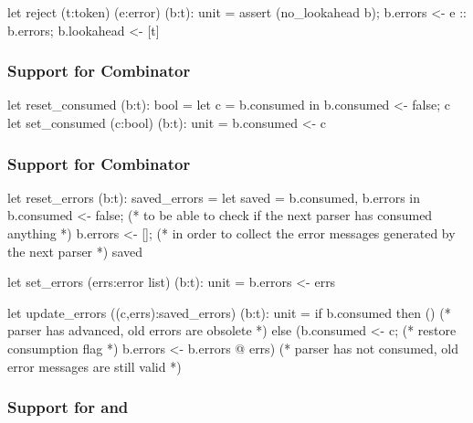 \begin{ocaml}
  let reject (t:token) (e:error) (b:t): unit =
    assert (no_lookahead b);
    b.errors <- e :: b.errors;
    b.lookahead <- [t]
\end{ocaml}


\subsubsection{Support for Combinator \code{<|>}}

\begin{ocaml}
  let reset_consumed (b:t): bool =
     let c = b.consumed in
     b.consumed <- false; c
  let set_consumed (c:bool) (b:t): unit =
     b.consumed <- c
\end{ocaml}

\subsubsection{Support for Combinator }

\begin{ocaml}
  let reset_errors (b:t): saved_errors =
     let saved = b.consumed, b.errors in
     b.consumed <- false;  (* to be able to check if the next parser has
                              consumed anything *)
     b.errors <- [];       (* in order to collect the error messages generated
                              by the next parser *)
     saved

  let set_errors (errs:error list) (b:t): unit =
     b.errors <- errs

  let update_errors ((c,errs):saved_errors) (b:t): unit =
     if b.consumed then
       () (* parser has advanced, old errors are obsolete *)
     else
       (b.consumed <- c;             (* restore consumption flag *)
        b.errors <- b.errors @ errs) (* parser has not consumed, old error
                                        messages are still valid *)
\end{ocaml}
%

\subsubsection{Support for  and  }

